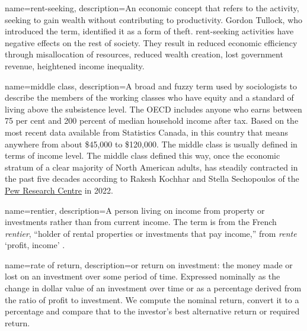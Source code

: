 {
name=rent-seeking,
description={An economic concept that refers to the activity, seeking to gain wealth without contributing to productivity. Gordon Tullock, who introduced  the term, identified it as a form of theft\cite{tullockWelfareCostsTariffs1967}.  %
\Gls{rent-seeking} activities have negative effects on the rest of society. They result in reduced economic efficiency through misallocation of resources, reduced wealth creation, lost government revenue, heightened income inequality.}
}

{
name=middle class,
description={A broad and fuzzy term used by sociologists to describe the members of the working classes who have equity and a standard of living above the subsistence level. The OECD includes anyone who earns between 75 per cent and 200 percent of median household income after tax. Based on the most recent data available from Statistics Canada, in this country that means anywhere from about \$45,000 to \$120,000. The middle class is usually defined in terms of income level. The middle class defined this way, once the economic stratum of a clear majority of North American adults, has steadily contracted in the past five decades according to
Rakesh Kochhar and  Stella Sechopoulos of the \href{https://www.pewresearch.org/fact-tank/2022/04/20/how-the-american-middle-class-has-changed-in-the-past-five-decades/}{Pew Research Centre}  in 2022.}
}

{
name=rentier,
description={A person living on income from property or investments rather than from current income. The term is from the  French \textit{rentier}, ``holder of rental properties or investments that pay income,'' from \textit{rente} `profit, income' \cite{GET_rentier_defn_quote}. %
}
}

{
name=rate of return,
description={or return on investment: the money made or lost on an investment over some period of time. Expressed nominally as the change in dollar value of an investment over time or  as a percentage derived from the ratio of profit to investment. We compute the nominal return, convert it to a percentage and compare that to the investor's best alternative return or required return.}
}

